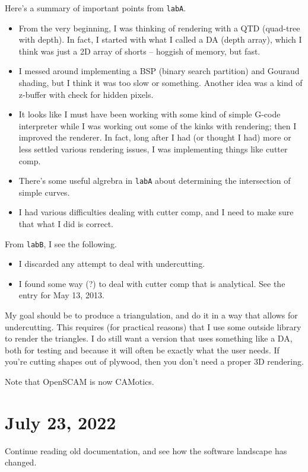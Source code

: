 \documentclass{article}
\begin{document}
Here's a summary of important points from {\tt labA}.
\begin{itemize}[itemsep = -3pt,leftmargin=*]
\item From the very beginning, I was thinking of rendering with a QTD
  (quad-tree with depth). In fact, I started with what I called a DA
  (depth array), which I think was just a 2D array of shorts --
  hoggish of memory, but fast.
\item I messed around implementing a BSP (binary search partition) and
  Gouraud shading, but I think it was too slow or something. Another
  idea was a kind of z-buffer with check for hidden pixels.
\item It looks like I must have been working with some
  kind of simple G-code interpreter while I was working out some of
  the kinks with rendering; then I improved the renderer. In fact,
  long after I had (or thought I had) more or less settled various
  rendering issues, I was implementing things like cutter comp.
\item There's some useful algrebra in {\tt labA} about determining the
  intersection of simple curves.
\item I had various difficulties dealing with cutter comp, and I need
  to make sure that what I did is correct.
\end{itemize}
From {\tt labB}, I see the following.
\begin{itemize}[itemsep = -3pt,leftmargin=*]
\item I discarded any attempt to deal with undercutting.
\item I found some way (?) to deal with cutter comp that is
  analytical. See the entry for May 13, 2013.
\end{itemize}

My goal should be to produce a triangulation, and do it in a way that
allows for undercutting. This requires (for practical reasons) that I
use some outside library to render the triangles. I do still want a
version that uses something like a DA, both for testing and because it
will often be exactly what the user needs. If you're cutting shapes
out of plywood, then you don't need a proper 3D rendering.

Note that OpenSCAM is now CAMotics.

\section{July 23, 2022}

Continue reading old documentation, and see how the software landscape
has changed.
\end{document}

